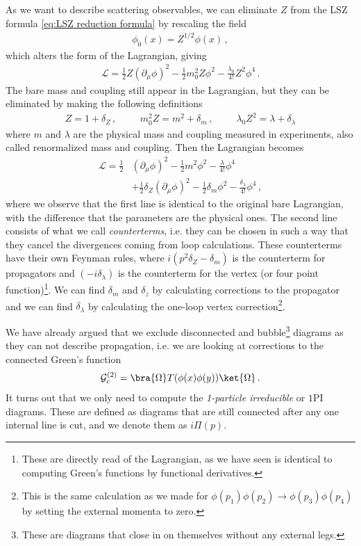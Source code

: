 As we want to describe scattering observables, we can eliminate $Z$ from the LSZ formula \cref{eq:LSZ reduction formula} by rescaling the field
\begin{align}
    \phi_{0}(x)=Z^{1/2}\phi(x)\,,
\end{align}
which alters the form of the Lagrangian, giving
\begin{align}
    \mathcal{L}=\frac{1}{2}Z(\partial_{\mu}\phi)^{2}-\frac{1}{2}m_{0}^{2}Z\phi^{2}-\frac{\lambda_{0}}{4!}Z^{2}\phi^{4}\,.
\end{align}
The bare mass and coupling still appear in the Lagrangian, but they can be eliminated by making the following definitions
\begin{align}
    Z=1+\delta_Z\,,\hspace{1cm}m_{0}^{2}Z=m^{2}+\delta_{m}\,,\hspace{1cm}\lambda_{0}Z^{2}=\lambda+\delta_{\lambda}
\end{align}
where $m$ and $\lambda$ are the physical mass and coupling measured in experiments, also called renormalized mass and coupling. Then the Lagrangian becomes
\begin{align}
    \mathcal{L}=\frac{1}{2}&(\partial_{\mu}\phi)^{2}-\frac{1}{2}m^{2}\phi^{2}-\frac{\lambda}{4!}\phi^{4}\nonumber
    \\
    &+\frac{1}{2}\delta_{Z}(\partial_{\mu}\phi)^{2}-\frac{1}{2}\delta_{m}\phi^{2}-\frac{\delta_{\lambda}}{4!}\phi^{4}\,,
\end{align}
where we observe that the first line is identical to the original bare Lagrangian, with the difference that the parameters are the physical ones. The second line consists of what we call \emph{counterterms}, i.e. they can be chosen in such a way that they cancel the divergences coming from loop calculations. These counterterms have their own Feynman rules, where $i(p^{2}\delta_{Z}-\delta_{m})$ is the counterterm for propagators and $(-i\delta_\lambda)$ is the counterterm for the vertex (or four point function)\footnote{These are directly read of the Lagrangian, as we have seen is identical to computing Green's functions by functional derivatives.}. We can find $\delta_{m}$ and $\delta_{z}$ by calculating corrections to the propagator and we can find $\delta_{\lambda}$ by calculating the one-loop vertex correction\footnote{This is the same calculation as we made for $\phi(p_1)\phi(p_2)\rightarrow \phi(p_3)\phi(p_4)$ by setting the external momenta to zero.}. 

We have already argued that we exclude disconnected and bubble\footnote{These are diagrams that close in on themselves without any external legs.} diagrams as they can not describe propagation, i.e. we are looking at corrections to the connected Green's function
\begin{align}
    \mathcal{G}_{c}^{(2)}=\bra{\Omega}T(\phi(x)\phi(y))\ket{\Omega}\,.
\end{align}
It turns out that we only need to compute the \emph{1-particle irreducible} or $1$PI diagrams. These are defined as diagrams that are still connected after any one internal line is cut, and we denote them as $i\Pi(p)$.


